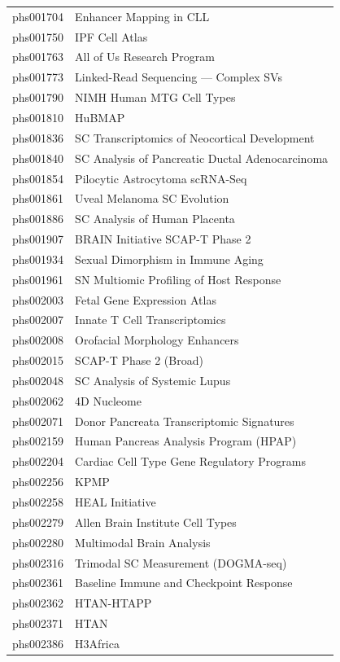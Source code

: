 \documentclass[11pt,letterpaper]{article}
\begin{document}
{\begin{longtable}{@{} l p{10cm} @{}}
phs001704 & Enhancer Mapping in CLL \\
phs001750 & IPF Cell Atlas \\
phs001763 & All of Us Research Program \\
phs001773 & Linked-Read Sequencing --- Complex SVs \\
phs001790 & NIMH Human MTG Cell Types \\
phs001810 & HuBMAP \\
phs001836 & SC Transcriptomics of Neocortical Development \\
phs001840 & SC Analysis of Pancreatic Ductal Adenocarcinoma \\
phs001854 & Pilocytic Astrocytoma scRNA-Seq \\
phs001861 & Uveal Melanoma SC Evolution \\
phs001886 & SC Analysis of Human Placenta \\
phs001907 & BRAIN Initiative SCAP-T Phase 2 \\
phs001934 & Sexual Dimorphism in Immune Aging \\
phs001961 & SN Multiomic Profiling of Host Response \\
phs002003 & Fetal Gene Expression Atlas \\
phs002007 & Innate T Cell Transcriptomics \\
phs002008 & Orofacial Morphology Enhancers \\
phs002015 & SCAP-T Phase 2 (Broad) \\
phs002048 & SC Analysis of Systemic Lupus \\
phs002062 & 4D Nucleome \\
phs002071 & Donor Pancreata Transcriptomic Signatures \\
phs002159 & Human Pancreas Analysis Program (HPAP) \\
phs002204 & Cardiac Cell Type Gene Regulatory Programs \\
phs002256 & KPMP \\
phs002258 & HEAL Initiative \\
phs002279 & Allen Brain Institute Cell Types \\
phs002280 & Multimodal Brain Analysis \\
phs002316 & Trimodal SC Measurement (DOGMA-seq) \\
phs002361 & Baseline Immune and Checkpoint Response \\
phs002362 & HTAN-HTAPP \\
phs002371 & HTAN \\
phs002386 & H3Africa \\

\end{longtable}}
\end{document}
